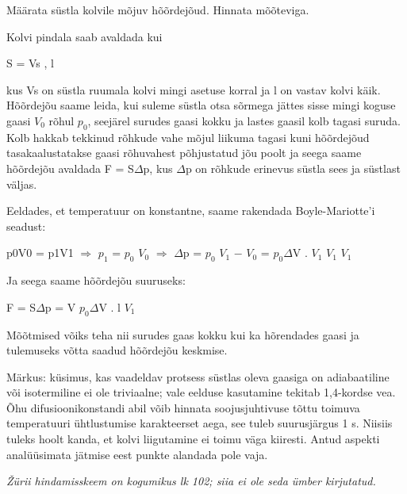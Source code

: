 
Määrata süstla kolvile mõjuv hõõrdejõud. Hinnata mõõteviga.

\hint

\solu
Kolvi pindala saab avaldada kui

S = Vs , l

kus Vs on süstla ruumala kolvi mingi asetuse korral ja l on vastav kolvi käik. Hõõrdejõu saame leida, kui suleme süstla otsa sõrmega jättes sisse mingi koguse gaasi $V_0$ rõhul $p_0$, seejärel surudes gaasi kokku ja lastes gaasil kolb tagasi suruda. Kolb hakkab tekkinud rõhkude vahe mõjul liikuma tagasi kuni hõõrdejõud tasakaalustatakse gaasi rõhuvahest põhjustatud jõu poolt ja seega saame hõõrdejõu avaldada F = S$\Delta$p, kus $\Delta$p on rõhkude erinevus süstla sees ja süstlast väljas.

Eeldades, et temperatuur on konstantne, saame rakendada Boyle-Mariotte'i seadust:

p0V0 = p1V1 $\Rightarrow$ $p_1$ = $p_0$ $V_0$ $\Rightarrow$ $\Delta$p = $p_0$ $V_1$ $-$ $V_0$ = $p_0$$\Delta$V . $V_1$ $V_1$ $V_1$

Ja seega saame hõõrdejõu suuruseks:

F = S$\Delta$p = V $p_0$$\Delta$V . l $V_1$

Mõõtmised võiks teha nii surudes gaas kokku kui ka hõrendades gaasi ja tulemuseks võtta saadud hõõrdejõu keskmise.

Märkus: küsimus, kas vaadeldav protsess süstlas oleva gaasiga on adiabaatiline või isotermiline ei ole triviaalne; vale eelduse kasutamine tekitab 1,4-kordse vea. Õhu difusioonikonstandi abil võib hinnata soojusjuhtivuse tõttu toimuva temperatuuri ühtlustumise karakteerset aega, see tuleb suurusjärgus 1 s. Niisiis tuleks hoolt kanda, et kolvi liigutamine ei toimu väga kiiresti. Antud aspekti analüüsimata jätmise eest punkte alandada pole vaja.

\textit{Žürii hindamisskeem on kogumikus lk 102; siia ei ole seda ümber kirjutatud.}
\probend
